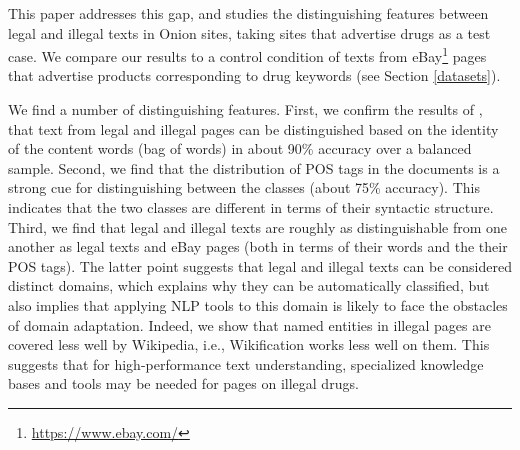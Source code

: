 \documentclass[11pt,a4paper,table]{article}
\newcommand{\es}[1]{\footnote{\color{purple}ES: #1}}
\begin{document}
  
  This paper addresses this gap, and studies the distinguishing features between legal and illegal texts in Onion sites,
  taking sites that advertise drugs as a test case. We compare our results to a control condition of texts 
  from eBay\footnote{\url{https://www.ebay.com/}} pages that 
	advertise products corresponding to drug keywords (see Section \ref{datasets}).
 
  We find a number of distinguishing features. First, we confirm the results of \citet{Avarikioti18}, 
	that text from legal and illegal pages can be distinguished based on the identity of the content words (bag of words) 
  in about 90\% accuracy over a balanced sample. Second, we find that the distribution of POS tags in the documents is a strong cue for 
	distinguishing between the classes (about 75\% accuracy). This indicates that the two classes are different in 
	terms of their syntactic structure. Third, we find that legal and illegal texts are roughly as distinguishable from one another as legal 
	texts and eBay pages (both in terms of their words and the their POS tags). 
	The latter point suggests that legal and illegal texts can be considered distinct domains, which explains why they can be 
	automatically classified, but also implies that applying NLP tools to this domain is likely to face the obstacles of domain adaptation.  
  Indeed, we show that named entities in illegal pages are covered less well by Wikipedia, i.e., Wikification works less well on them.
  This suggests that for high-performance text understanding, specialized knowledge bases and tools may be needed for pages on illegal drugs.
  
	
%   
%   
%   
%
%
%
%
\end{document}
